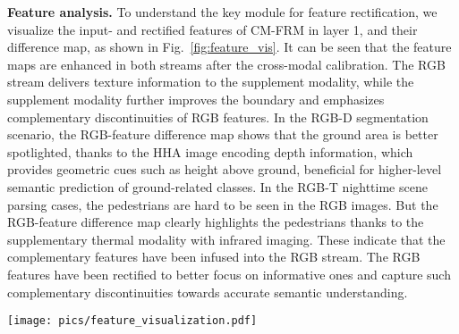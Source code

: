 \documentclass[journal]{IEEEtran}
\begin{document}
\noindent\textbf{Feature analysis.}
To understand the key module for feature rectification, we visualize the input- and rectified features of CM-FRM in layer 1, and their difference map, as shown in Fig.~\ref{fig:feature_vis}.
It can be seen that the feature maps are enhanced in both streams after the cross-modal calibration. The RGB stream delivers texture information to the supplement modality, while the supplement modality further improves the boundary and emphasizes complementary discontinuities of RGB features.
In the RGB-D segmentation scenario, the RGB-feature difference map shows that the ground area is better spotlighted, thanks to the HHA image encoding depth information, which provides geometric cues such as height above ground, beneficial for higher-level semantic prediction of ground-related classes. 
In the RGB-T nighttime scene parsing cases, the pedestrians are hard to be seen in the RGB images. But the RGB-feature difference map clearly highlights the pedestrians thanks to the supplementary thermal modality with infrared imaging.
These indicate that the complementary features have been infused into the RGB stream. The RGB features have been rectified to better focus on informative ones and capture such complementary discontinuities towards accurate semantic understanding.
\begin{figure*}[!t]
    \centering
    \texttt{[image: pics/feature\_visualization.pdf]}
    \caption{Visualization of the feature extracted in layer 1 and the rectified feature, and their difference map.}
    \label{fig:feature_vis}
\end{figure*}
\end{document}
